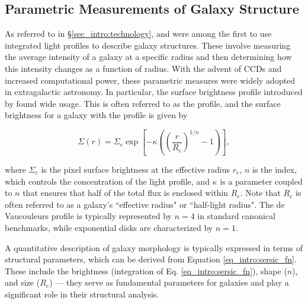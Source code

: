 \subsection{Parametric Measurements of Galaxy Structure} \label{sec_intro:parametric_measures}

As referred to in \S \ref{sec_intro:technology}, \citeauthor{de_vac_48} and \citeauthor{sersic_63} were among the first to use integrated light profiles to describe galaxy structures. These involve measuring the average intensity of a galaxy at a specific radius and then determining how this intensity changes as a function of radius. With the advent of CCDs and increased computational power, these parametric measures were widely adopted in extragalactic astronomy. In particular, the surface brightness profile introduced by \citet{sersic_63} found wide usage. This is often referred to as the \sersic{} profile, and the surface brightness for a galaxy with the profile is given by

\begin{equation}
\label{eq_intro:sersic_fn}
\Sigma(r) = \Sigma_e \exp \left[ -\kappa \left( \left( \frac{r}{R_e}\right)^{1/n} - 1 \right) \right] ,
\end{equation}

\noindent where $\Sigma_e$ is the pixel surface brightness at the effective radius $r_e$, $n$ is the \sersic{} index, which controls the concentration of the light profile, and $\kappa$ is a parameter coupled to $n$ that ensures that half of the total flux is enclosed within $R_e$. Note that $R_e$ is often referred to as a galaxy's ``effective radius" or ``half-light radius". The de Vaucouleurs profile is typically represented by $n = 4$ in standard canonical benchmarks, while exponential disks are characterized by $n = 1$. 

A quantitative description of galaxy morphology is typically expressed in terms of structural parameters, which can be derived from Equation \ref{eq_intro:sersic_fn}. These include the brightness (integration of Eq. \ref{eq_intro:sersic_fn}), shape ($n$), and size ($R_e$) --- they serve as fundamental parameters for galaxies and play a significant role in their structural analysis. 

